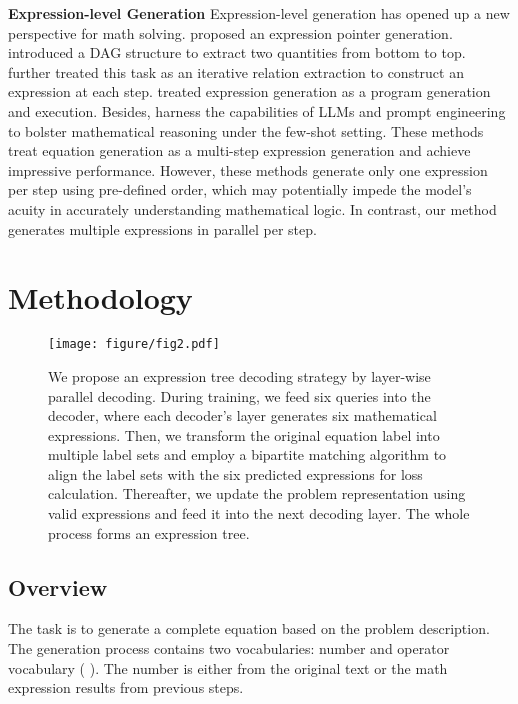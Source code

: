 \documentclass[11pt]{article}
\begin{document}
\indent \textbf{Expression-level Generation} Expression-level generation has opened up a new perspective for math solving. \citet{kim-etal-2020-point} proposed an expression pointer generation. \citet{cao2021bottom} introduced a DAG structure to extract two quantities from bottom to top. \citet{jie-etal-2022-learning,wang2023msat} further treated this task as an iterative relation extraction to construct an expression at each step. \citet{zhang2022elastic} treated expression generation as a program generation and execution. Besides, \citet{lee2023recursion,zhang2023interpretable,he2023solving,zhu2022solving} harness the capabilities of LLMs and prompt engineering to bolster mathematical reasoning under the few-shot setting. These methods treat equation generation as a multi-step expression generation and achieve impressive performance. However, these methods generate only one expression per step using pre-defined order, which may potentially impede the model's acuity in accurately understanding mathematical logic. In contrast, our method generates multiple expressions in parallel per step.







\section{Methodology}
\begin{figure*}[t] \centering \texttt{[image: figure/fig2.pdf]} \caption{We propose an expression tree decoding strategy by layer-wise parallel decoding. During training, we feed six queries into the decoder, where each decoder's layer generates six mathematical expressions. Then, we transform the original equation label into multiple label sets and employ a bipartite matching algorithm to align the label sets with the six predicted expressions for loss calculation. Thereafter, we update the problem representation using valid expressions and feed it into the next decoding layer. The whole process forms an expression tree.} \label{Fig.f2} \end{figure*}





\subsection{Overview} \label{section3.1}
The task is to generate a complete equation based on the problem description. The generation process contains two vocabularies: number and operator vocabulary ( ). The number is either from the original text or the math expression results from previous steps. 
\end{document}

